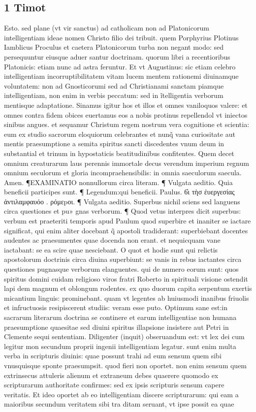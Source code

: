 \documentclass{article}
\begin{document}
\begin{pages}
\section*{1 Timot }
\marginpar{[ p.213 ]}\pstart Esto. sed plane (vt vir sanctus) ad catholicam non ad Platonicorum intelligentiam ideae nomen Christo filio dei tribuit. quem Porphyrius Plotinus Iamblicus Proculus et caetera Platonicorum turba non negant modo: sed persequuntur eiusque aduer santur doctrinam. quorum libri a recentioribus Platonicis: etiam nunc ad astra feruntur. Et vt Augustinus: sic etiam celebro intelligentiam incorruptibilitatem vitam lucem mentem rationemi diuinamque voluntatem: non ad Gnosticorumi sed ad Christianami sanctam piamque  intelligentiam, non enim in verbis peccatum: sed in ĩtelligentia verborum mentisque adaptatione. Sinamus igitur hos et illos et omnes vaniloquos valere: et omnes contra fidem obices euertamus eos a nobis protinus repellendol vt iniectos sinibus angues. et sequamur Christum regem nostrum vera cognitione et scientia: eum ex studio sacrorum eloquiorum celebrantes et nunq̃ vana curiositate aut mentis praesumptione a semita spiritus sancti discedentes vnum deum in substantial et trinum in hypostaticis beatitudinibus confitentes. Quem decet omnium creaturarum laus perennis immortale decus verendum imperium regnum omnium seculorum et gloria incompraehensibilis: in omnia saeculorum saecula. Amen.  \pend\pstart *¶EXAMINATIO nonnullorum circa literam. ¶ Vulgata aeditio. Quia beneficii participes sunt. ¶ Legendum:qui beneficii. Paulus. 6̔ι τὴσ ἐυεργεσίας ἀντιλαμφαυόο . ρόμεpοι. ¶ Vulgata aeditio. Superbus nichil sciens sed languens circa questiones et pu» gnas verborum. ¶ Quod vetus interpres dicit superbus: verbum est praeteriti temporis apud Paulum quod superbire et inaniter se iactare significat, qui enim aliter docebant q̃ apostoli tradiderant: superbiebant docentes audentes ac praesumentes quae docenda non erant. et nequicquam vane iactabant: se ea scire quae nesciebant. O quot et hodie sunt qui relictis apostolorum doctrinis circa diuina superbiunt: se vanis in rebus iactantes circa questiones pugnasque verborum elanguentes. qui de numero eorum sunt: quos spiritus domini cuidam religioso viros fratri Roberto in spirituali visione ostendit lapi dem magnum et oblongum rodentes. ex quo duorum capita serpentum exertis micantium linguis: prominebant. quam vt legentes ab huiusmodi inanibus friuolis et infructuosis resipiscerent studiis: veram esse puto. Optimum sane est:in sacrarum literarum doctrina se continere et earum intelligentiae non humana praesumptione quaesitae sed diuini spiritus illapsione insistere aut Petri in Clemente sequi sententiam. Diligenter (inquit) obseruandum est: vt lex dei cum legitur mon secundum proprii ingenii intelligentiam legatur. sunt enim multa verba in scripturis diuinis: quae possunt trahi ad eum sensum quem sibi vnusquisque sponte praesumpsit. quod fieri non oportet. non enim sensum quem extrinsecus attuleris alienum et extraneum debes quaerere quomodo ex scripturarum authoritate confirmes: sed ex ipsis scripturis sensum capere veritatis. Et ideo oportet ab eo intelligentiam discere scripturarum: qui eam a maioribus secundum veritatem sibi tra ditam seruant, vt ipse possit ea quae 
\end{pages}
\end{document}
